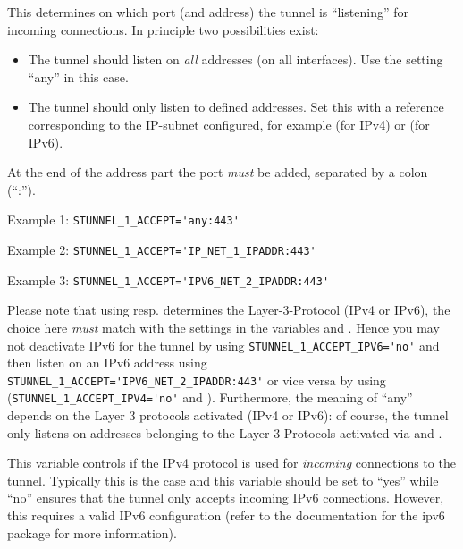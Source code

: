 \begin{description}

This determines on which port (and address) the tunnel is ``listening''
for incoming connections. In principle two possibilities exist:

\begin{itemize}
\item The tunnel should listen on \emph{all} addresses (on all interfaces).
Use the setting ``any'' in this case.
\item The tunnel should only listen to defined addresses. Set this with
a reference corresponding to the IP-subnet configured, for example
 (for IPv4) or  (for IPv6).
\end{itemize}

At the end of the address part the port \emph{must} be added, separated
by a colon (``:'').

Example 1: \verb+STUNNEL_1_ACCEPT='any:443'+

Example 2: \verb+STUNNEL_1_ACCEPT='IP_NET_1_IPADDR:443'+

Example 3: \verb+STUNNEL_1_ACCEPT='IPV6_NET_2_IPADDR:443'+

Please note that using  resp. 
determines the Layer-3-Protocol (IPv4 or IPv6), the choice here \emph{must}
match with the settings in the variables  and
. Hence you may not deactivate IPv6 for the tunnel
by using \verb+STUNNEL_1_ACCEPT_IPV6='no'+ and then listen on an IPv6 address using
\verb+STUNNEL_1_ACCEPT='IPV6_NET_2_IPADDR:443'+ or vice versa by using
(\verb+STUNNEL_1_ACCEPT_IPV4='no'+ and ).
Furthermore, the meaning of ``any'' depends on the Layer 3 protocols activated
(IPv4 or IPv6): of course, the tunnel only listens on addresses belonging to the
Layer-3-Protocols activated via  and
.


This variable controls if the IPv4 protocol is used for \emph{incoming} connections
to the tunnel. Typically this is the case and this variable should be set to ``yes''
while ``no'' ensures that the tunnel only accepts incoming IPv6 connections. However,
this requires a valid IPv6 configuration (refer to the documentation for the ipv6
package for more information).


\end{description}
